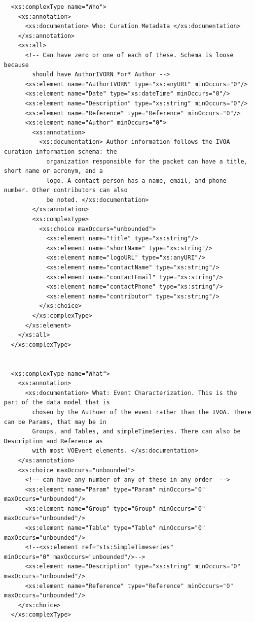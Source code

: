 \documentclass[11pt,a4paper]{ivoa}
\begin{document}
{\begin{verbatim}
  <xs:complexType name="Who">
    <xs:annotation>
      <xs:documentation> Who: Curation Metadata </xs:documentation>
    </xs:annotation>
    <xs:all>
      <!-- Can have zero or one of each of these. Schema is loose because
        should have AuthorIVORN *or* Author -->
      <xs:element name="AuthorIVORN" type="xs:anyURI" minOccurs="0"/>
      <xs:element name="Date" type="xs:dateTime" minOccurs="0"/>
      <xs:element name="Description" type="xs:string" minOccurs="0"/>
      <xs:element name="Reference" type="Reference" minOccurs="0"/>
      <xs:element name="Author" minOccurs="0">
        <xs:annotation>
          <xs:documentation> Author information follows the IVOA curation information schema: the
            organization responsible for the packet can have a title, short name or acronym, and a
            logo. A contact person has a name, email, and phone number. Other contributors can also
            be noted. </xs:documentation>
        </xs:annotation>
        <xs:complexType>
          <xs:choice maxOccurs="unbounded">
            <xs:element name="title" type="xs:string"/>
            <xs:element name="shortName" type="xs:string"/>
            <xs:element name="logoURL" type="xs:anyURI"/>
            <xs:element name="contactName" type="xs:string"/>
            <xs:element name="contactEmail" type="xs:string"/>
            <xs:element name="contactPhone" type="xs:string"/>
            <xs:element name="contributor" type="xs:string"/>
          </xs:choice>
        </xs:complexType>
      </xs:element>
    </xs:all>
  </xs:complexType>


  <xs:complexType name="What">
    <xs:annotation>
      <xs:documentation> What: Event Characterization. This is the part of the data model that is
        chosen by the Authoer of the event rather than the IVOA. There can be Params, that may be in
        Groups, and Tables, and simpleTimeSeries. There can also be Description and Reference as
        with most VOEvent elements. </xs:documentation>
    </xs:annotation>
    <xs:choice maxOccurs="unbounded">
      <!-- can have any number of any of these in any order  -->
      <xs:element name="Param" type="Param" minOccurs="0" maxOccurs="unbounded"/>
      <xs:element name="Group" type="Group" minOccurs="0" maxOccurs="unbounded"/>
      <xs:element name="Table" type="Table" minOccurs="0" maxOccurs="unbounded"/>
      <!--<xs:element ref="sts:SimpleTimeseries"          minOccurs="0" maxOccurs="unbounded"/>-->
      <xs:element name="Description" type="xs:string" minOccurs="0" maxOccurs="unbounded"/>
      <xs:element name="Reference" type="Reference" minOccurs="0" maxOccurs="unbounded"/>
    </xs:choice>
  </xs:complexType>



\end{verbatim}}
\end{document}
